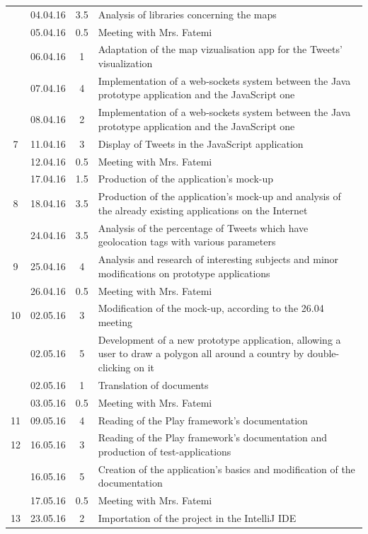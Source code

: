 \documentclass[a4paper,11pt]{report}
\begin{document}
\begin{center}
\begin{longtable}{c|l|c|p{10cm}}
     & 04.04.16 & 3.5 & Analysis of libraries concerning the maps\\
     & 05.04.16 & 0.5 & Meeting with Mrs. Fatemi\\
     & 06.04.16 & 1 & Adaptation of the map vizualisation app for the Tweets' visualization\\
     & 07.04.16 & 4 & Implementation of a web-sockets system between the Java prototype application and the JavaScript one\\
     & 08.04.16 & 2 & Implementation of a web-sockets system between the Java prototype application and the JavaScript one\\\hline
    7 & 11.04.16 & 3 & Display of Tweets in the JavaScript application\\
     & 12.04.16 & 0.5 & Meeting with Mrs. Fatemi\\
     & 17.04.16 & 1.5 & Production of the application's mock-up\\\hline
    8 & 18.04.16 & 3.5 & Production of the application's mock-up and analysis of the already existing applications on the Internet\\
     & 24.04.16 & 3.5 & Analysis of the percentage of Tweets which have geolocation tags with various parameters\\\hline
    9 & 25.04.16 & 4 & Analysis and research of interesting subjects and minor modifications on prototype applications\\
     & 26.04.16 & 0.5 & Meeting with Mrs. Fatemi\\\hline
    10 & 02.05.16 & 3 & Modification of the mock-up, according to the 26.04 meeting\\
     & 02.05.16 & 5 & Development of a new prototype application, allowing a user to draw a polygon all around a country by double-clicking on it\\
     & 02.05.16 & 1 & Translation of documents\\
     & 03.05.16 & 0.5 & Meeting with Mrs. Fatemi\\\hline
    11 & 09.05.16 & 4 & Reading of the Play framework's documentation\\\hline
    12 & 16.05.16 & 3 & Reading of the Play framework's documentation and production of test-applications\\
     & 16.05.16 & 5 & Creation of the application's basics and modification of the documentation\\
     & 17.05.16 & 0.5 & Meeting with Mrs. Fatemi\\\hline
    13 & 23.05.16 & 2 & Importation of the project in the IntelliJ IDE\\

\end{longtable}
\end{center}
\end{document}
